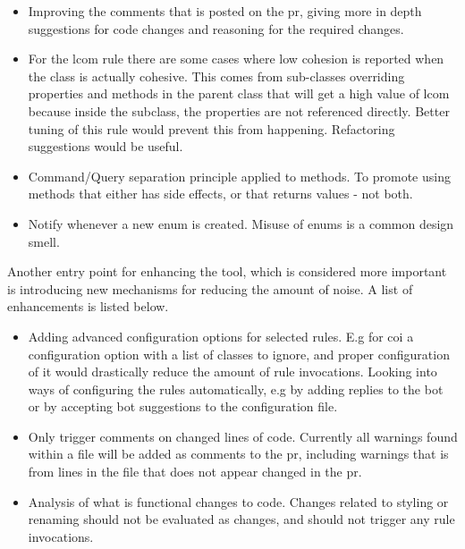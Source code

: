 \documentclass{report}
\begin{document}
\begin{itemize}
    \item Improving the comments that is posted on the \gls{pr}, giving more in depth suggestions for code changes and reasoning for the required changes.  

    \item For the \gls{lcom} rule there are some cases where low cohesion is reported when the class is actually cohesive. This comes from sub-classes overriding properties and methods in the parent class that will get a high value of \gls{lcom} because inside the subclass, the properties are not referenced directly. Better tuning of this rule would prevent this from happening. Refactoring suggestions would be useful.
    
    \item Command/Query separation principle applied to methods. To promote using methods that either has side effects, or that returns values - not both. 
    
    \item Notify whenever a new enum is created. Misuse of enums is a common design smell.
\end{itemize}


Another entry point for enhancing the tool, which is considered more important is introducing new mechanisms for reducing the amount of noise. A list of enhancements is listed below.

\begin{itemize}
    \item Adding advanced configuration options for selected rules. E.g for \gls{coi} a configuration option with a list of classes to ignore, and proper configuration of it would drastically reduce the amount of rule invocations. Looking into ways of configuring the rules automatically, e.g by adding replies to the bot or by accepting bot suggestions to the configuration file.
    
    \item Only trigger comments on changed lines of code. Currently all warnings found within a file will be added as comments to the \gls{pr}, including warnings that is from lines in the file that does not appear changed in the \gls{pr}. 
    
    \item Analysis of what is functional changes to code. Changes related to styling or renaming should not be evaluated as changes, and should not trigger any rule invocations.
\end{itemize}
\end{document}
